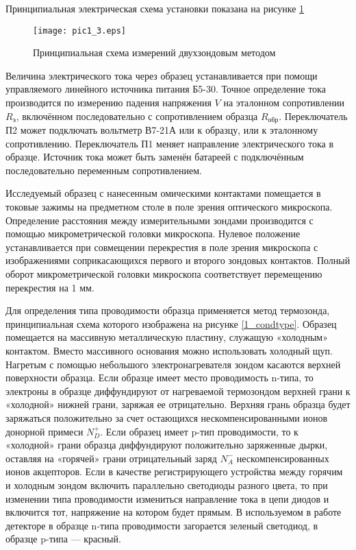 Принципиальная электрическая схема установки показана на рисунке \ref{1_scheme}

\begin{figure}[h!]\centering
\texttt{[image: pic1\_3.eps]}
\caption{Принципиальная схема измерений двухзондовым методом}
\label{1_scheme}
\end{figure}

Величина электрического тока через образец устанавливается при помощи управляемого линейного источника питания Б5-30. Точное определение тока производится по измерению падения напряжения $V$ на эталонном сопротивлении $R_{\text{э}}$, включённом последовательно с сопротивлением образца $R_{\text{обр}}$. Переключатель П2 может подключать вольтметр В7-21А или к образцу, или к эталонному сопротивлению. Переключатель П1 меняет направление электрического тока в образце. Источник тока может быть заменён батареей с подключённым последовательно переменным сопротивлением.

Исследуемый образец с нанесенным омическими контактами помещается в токовые зажимы на предметном столе в поле зрения оптического микроскопа. Определение расстояния между измерительными зондами производится с помощью микрометрической головки микроскопа. Нулевое положение устанавливается при совмещении перекрестия в поле зрения микроскопа с изображениями соприкасающихся первого и второго зондовых контактов. Полный оборот микрометрической головки микроскопа соответствует перемещению перекрестия на 1 мм.

Для определения типа проводимости образца применяется метод термозонда, принципиальная схема которого изображена на рисунке \ref{1_condtype}. Образец помещается на массивную металлическую пластину, служащую «холодным» контактом. Вместо массивного основания можно использовать холодный щуп. Нагретым с помощью небольшого электронагревателя зондом касаются верхней поверхности образца. Если образце имеет место проводимость n-типа, то электроны в образце диффундируют от нагреваемой термозондом верхней грани к «холодной» нижней грани, заряжая ее отрицательно. Верхняя грань образца будет заряжаться положительно за счет остающихся нескомпенсированными ионов донорной примеси $N_{D}^{+}$. Если образец имеет p-тип проводимости, то к «холодной» грани образца диффундируют положительно заряженные дырки, оставляя на «горячей» грани отрицательный заряд $N_{A}^{-}$ нескомпенсированных ионов акцепторов. Если в качестве регистрирующего устройства между горячим и холодным зондом включить параллельно светодиоды разного цвета, то при изменении типа проводимости измениться направление тока в цепи диодов и включится тот, напряжение на котором будет прямым. В используемом в работе детекторе в образце n-типа проводимости загорается зеленый светодиод, в образце p-типа — красный.

